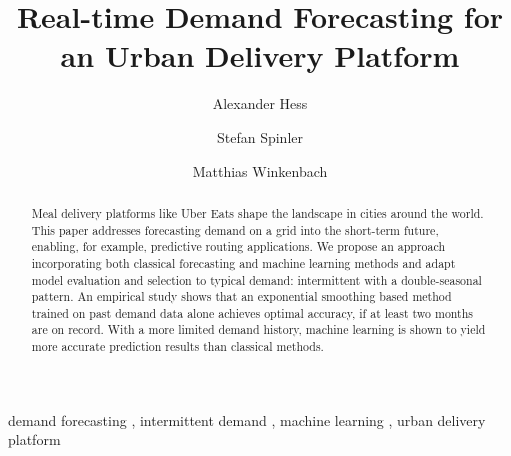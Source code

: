 \begin{frontmatter}

\title{Real-time Demand Forecasting for an Urban Delivery Platform}

\author[WHU]{Alexander Hess}
\author[WHU]{Stefan Spinler}
\author[MIT]{Matthias Winkenbach}
\address[WHU]{
WHU - Otto Beisheim School of Management,
Burgplatz 2, 56179 Vallendar, Germany
}
\address[MIT]{
Massachusetts Institute of Technology,
77 Massachusetts Avenue, Cambridge, MA 02139, United States
}

\begin{abstract}
Meal delivery platforms like Uber Eats shape the landscape in cities around the world.
This paper addresses forecasting demand on a grid into the short-term future,
    enabling, for example, predictive routing applications.
We propose an approach incorporating
    both classical forecasting and machine learning methods
    and adapt model evaluation and selection to typical demand:
        intermittent with a double-seasonal pattern.
An empirical study shows that
    an exponential smoothing based method trained on past demand data alone
        achieves optimal accuracy,
    if at least two months are on record.
With a more limited demand history,
    machine learning is shown
    to yield more accurate prediction results than classical methods.
\end{abstract}

\begin{keyword}
demand forecasting \sep
intermittent demand \sep
machine learning \sep
urban delivery platform
\end{keyword}

\end{frontmatter}
